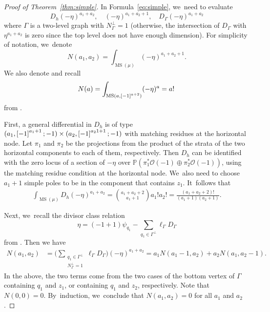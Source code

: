 \documentclass[11pt]{article}
\newcommand\PP{{\mathbb P}}
\newcommand{\mO}{\mathcal{O}}
\DeclareMathOperator\MS{MS}
\theoremstyle{definition}
\begin{document}
\begin{proof}[Proof of Theorem~\ref{thm:simple}]
In Formula~\eqref{eq:simple}, we~need to evaluate
\[
D_h (-\eta)^{a_1+a_2}, \quad (-\eta)^{a_1+a_2+1},\quad D_\Gamma (-\eta)^{a_1+a_2}
\]
where $\Gamma$ is a two-level graph with $N_\Gamma^{\bot} = 1$ (otherwise, the intersection of $D_\Gamma$ with $\eta^{a_1+a_2}$ is zero since the top level does not have enough dimension). For simplicity of notation, we~denote
\[
N(a_1, a_2) = \int_{\MS(\mu)} (-\eta)^{a_1+a_2+1}.
\]
We also denote and recall
\[
N(a) = \int_{\MS(a, \rec[-1][a+2])} (-\eta)^{a} = a! \,
\]
from \cite{ChPrIso}.

First, a general differential in $D_h$ is of type $(a_1,\rec[-1][a_1+1]; -1)\times (a_2, \rec[-1][a_21+1]; -1)$ with matching residues at the horizontal node. Let $\pi_1$ and $\pi_2$ be the projections from the product of the strata of the two horizontal components to each of them, respectively. Then $D_h$ can be identified with the zero locus of a section of $-\eta$ over $\PP(\pi_1^{*}\mO(-1) \oplus \pi_2^{*}\mO(-1))$, using the matching residue condition at the horizontal node. We~also need to choose $a_1+1$ simple poles to be in the component that contains $z_1$. It~follows that
\begin{align*}
\int_{\MS(\mu)}D_h (-\eta)^{a_1+a_2} = \binom{a_1 + a_2 + 2 }{a_1 + 1} a_1 ! a_2 !  = \frac{(a_1+a_2+2)!}{(a_1+1)(a_2+1)}.
\end{align*}

Next, we~recall the divisor class relation
\[
\eta = (-1+1) \psi_{q_1} -\sum_{q_1\in \Gamma^\bot} \ell_\Gamma D_\Gamma
\]
from \cite[Prop.\,8.2]{CMZ}.
Then we have
\begin{align*}
N (a_1, a_2) & = \biggl( \sum_{\substack{q_1\in \Gamma^\bot\\ N_\Gamma^{\bot} = 1}} \ell_\Gamma D_\Gamma \biggr) (-\eta)^{a_1+a_2} = a_1 N(a_1-1, a_2) + a_2 N(a_1, a_2-1).
\end{align*}
In the above, the two terms come from the two cases of the bottom vertex of $\Gamma$ containing $q_1$ and $z_1$, or containing $q_1$ and $z_2$, respectively. Note that $N(0,0) = 0$. By~induction, we~conclude that $N(a_1, a_2) = 0$ for all $a_1$ and $a_2$.


\end{proof}
\end{document}
